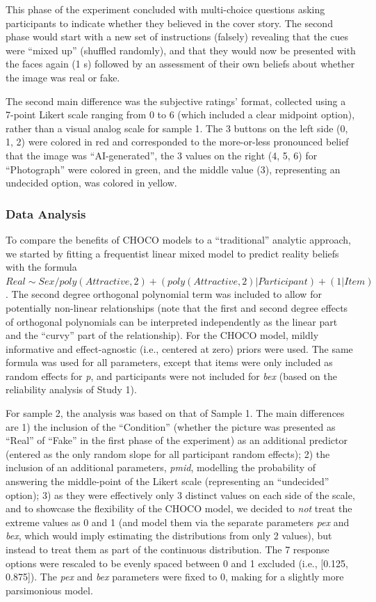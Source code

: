 \documentclass[
  jou,
  floatsintext,
  longtable,
  nolmodern,
  notxfonts,
  notimes,
  colorlinks=true,linkcolor=blue,citecolor=blue,urlcolor=blue]{apa7}
\begin{document}
This phase of the experiment concluded with multi-choice questions
asking participants to indicate whether they believed in the cover
story. The second phase would start with a new set of instructions
(falsely) revealing that the cues were ``mixed up'' (shuffled randomly),
and that they would now be presented with the faces again (1 s) followed
by an assessment of their own beliefs about whether the image was real
or fake.

The second main difference was the subjective ratings' format, collected
using a 7-point Likert scale ranging from 0 to 6 (which included a clear
midpoint option), rather than a visual analog scale for sample 1. The 3
buttons on the left side (0, 1, 2) were colored in red and corresponded
to the more-or-less pronounced belief that the image was
``AI-generated'', the 3 values on the right (4, 5, 6) for ``Photograph''
were colored in green, and the middle value (3), representing an
undecided option, was colored in yellow.

\subsubsection{Data Analysis}\label{data-analysis-1}

To compare the benefits of CHOCO models to a ``traditional'' analytic
approach, we started by fitting a frequentist linear mixed model to
predict reality beliefs with the formula
\(Real\sim Sex / poly(Attractive, 2) + (poly(Attractive, 2)|Participant) + (1|Item)\).
The second degree orthogonal polynomial term was included to allow for
potentially non-linear relationships (note that the first and second
degree effects of orthogonal polynomials can be interpreted
independently as the linear part and the ``curvy'' part of the
relationship). For the CHOCO model, mildly informative and
effect-agnostic (i.e., centered at zero) priors were used. The same
formula was used for all parameters, except that items were only
included as random effects for \emph{p}, and participants were not
included for \emph{bex} (based on the reliability analysis of Study 1).

For sample 2, the analysis was based on that of Sample 1. The main
differences are 1) the inclusion of the ``Condition'' (whether the
picture was presented as ``Real'' of ``Fake'' in the first phase of the
experiment) as an additional predictor (entered as the only random slope
for all participant random effects); 2) the inclusion of an additional
parameters, \emph{pmid}, modelling the probability of answering the
middle-point of the Likert scale (representing an ``undecided'' option);
3) as they were effectively only 3 distinct values on each side of the
scale, and to showcase the flexibility of the CHOCO model, we decided to
\emph{not} treat the extreme values as 0 and 1 (and model them via the
separate parameters \emph{pex} and \emph{bex}, which would imply
estimating the distributions from only 2 values), but instead to treat
them as part of the continuous distribution. The 7 response options were
rescaled to be evenly spaced between 0 and 1 excluded (i.e., {[}0.125,
0.875{]}). The \emph{pex} and \emph{bex} parameters were fixed to 0,
making for a slightly more parsimonious model.
\end{document}
